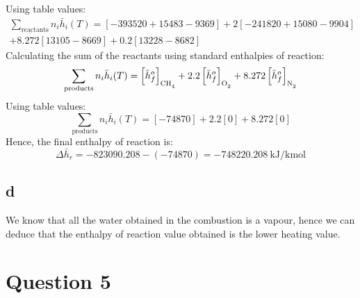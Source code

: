 \documentclass[11pt]{article}
\numberwithin{equation}{section}
\begin{document}
Using table values:
\begin{multline}
    \sum_{\textrm{reactants}} n_i \bar{h}_{i}(T) = \left[-393520 + 15483 - 9369\right] + 2 \left[ -241820 + 15080 - 9904\right] \\ + 8.272 \left[13105 -8669\right] + 0.2 \left[13228-8682\right]
\end{multline}
Calculating the sum of the reactants using standard enthalpies of reaction:
\begin{equation}
    \sum_{\textrm{products}} n_i \bar{h}_{i}(T) = \left[\bar{h}^o_{f}\right]_{\ce{CH4}} + 2.2\left[\bar{h}^o_{f}\right]_{\ce{O2}} + 8.272\left[\bar{h}^o_{f}\right]_{\ce{N2}}
\end{equation}
Using table values:
\begin{equation}
    \sum_{\textrm{products}} n_i \bar{h}_{i}(T) = \left[-74870\right] + 2.2\left[ 0 \right] + 8.272\left[0\right]
\end{equation}
Hence, the final enthalpy of reaction is:
\begin{equation}
    \Delta \bar{h}_r = -823090.208 - \left( - 74870\right) = \SI{-748220.208}{\kilo\joule\per\kilo\mol }
\end{equation}
\subsection{d}
We know that all the water obtained in the combustion is a vapour, hence we can deduce that the enthalpy of reaction value obtained is the lower heating value.
\section{Question 5}
\end{document}
